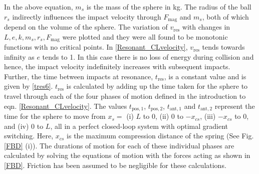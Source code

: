 \documentclass[letterpaper, 10 pt, journal, twoside]{ieeetran}
\begin{document}
In the above equation, $m_s$ is the mass of the sphere in kg. The radius of the ball $r_s$ indirectly influences the impact velocity through $F_{\textrm{mag}}$ and $m_s$, both of which depend on the volume of the sphere. The variation of $v_\text{res}$ with changes in $L,e,k,m_s,r_s,F_{\textrm{mag}}$ were plotted and they were all found to be monotonic functions with no critical points. In \cref{Resonant_CLvelocity}, $v_\text{res}$ tends towards infinity as $e$ tends to 1. In this case there is no loss of energy during collision and hence, the impact velocity indefinitely increases with subsequent impacts. Further, the time between impacts at resonance, $t_\text{res}$, is a constant value and is given by \cref{tres6}. $t_\text{res}$ is calculated by adding up the time taken for the sphere to travel through each of the four phases of motion defined in the introduction to eqn. \ref{Resonant_CLvelocity}. The values $t_{\text{pos},1}$, $t_{\text{pos},2}$, $t_{\text{ant},1}$ and $t_{\text{ant},2}$ represent the time for the sphere to move from $x_s =$ (i) $L$ to 0, (ii) 0 to $-x_{cs}$, (iii) $-x_{cs}$ to 0, and (iv) 0 to $L$, all in a perfect closed-loop system with optimal gradient switching. Here, $x_{cs}$ is the maximum compression distance of the spring (See Fig. \ref{FBD} (i)). The durations of motion for each of these individual phases are calculated by solving the equations of motion with the forces acting as shown in \cref{FBD}. Friction has been assumed to be negligible for these calculations.
\end{document}
